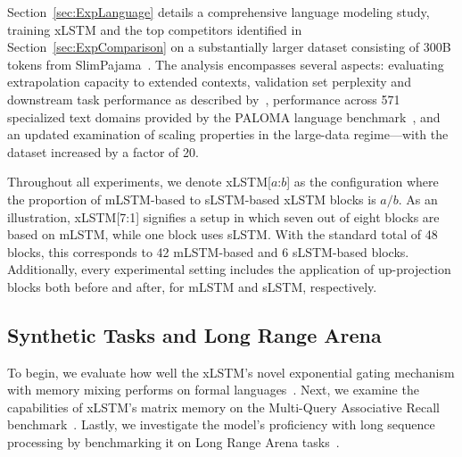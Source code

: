 Section~\ref{sec:ExpLanguage} details a comprehensive language modeling study, training xLSTM and the top competitors identified in Section~\ref{sec:ExpComparison} on a substantially larger dataset consisting of 300B tokens from SlimPajama~\citep{Soboleva:23}. The analysis encompasses several aspects: evaluating extrapolation capacity to extended contexts, validation set perplexity and downstream task performance as described by~\citep{Sutawika:24}, performance across 571 specialized text domains provided by the PALOMA language benchmark~\citep{Magnusson:23arxivshort}, and an updated examination of scaling properties in the large-data regime—with the dataset increased by a factor of 20.

Throughout all experiments, we denote xLSTM[$a$:$b$] as the configuration where the proportion of mLSTM-based to sLSTM-based xLSTM blocks is $a/b$. As an illustration, xLSTM[7:1] signifies a setup in which seven out of eight blocks are based on mLSTM, while one block uses sLSTM. With the standard total of 48 blocks, this corresponds to 42 mLSTM-based and 6 sLSTM-based blocks. Additionally, every experimental setting includes the application of up-projection blocks both before and after, for mLSTM and sLSTM, respectively.

\subsection{Synthetic Tasks and Long Range Arena}
\label{sec:ExpSyntethic}
To begin, we evaluate how well the xLSTM's novel exponential gating mechanism with memory mixing performs on formal languages~\citep{Deletang:23}. Next, we examine the capabilities of xLSTM's matrix memory on the Multi-Query Associative Recall benchmark~\citep{Arora:23arxiv}. Lastly, we investigate the model’s proficiency with long sequence processing by benchmarking it on Long Range Arena tasks~\citep{Tay:21}.

